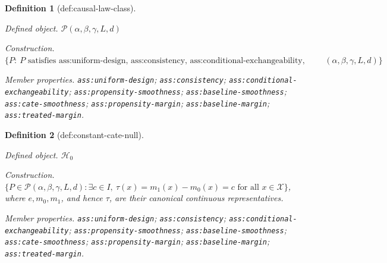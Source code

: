 \documentclass{article}
\newtheorem{definition}{Definition}
\begin{document}
\begin{definition}[def:causal-law-class]\label{def:causal-law-class}
\par\smallskip\noindent\emph{Defined object.} \(\mathcal P(\alpha,\beta,\gamma,L,d)\)
\par\smallskip\noindent\emph{Construction.} \(\{P:\ P\text{ satisfies ass:uniform-design, ass:consistency, ass:conditional-exchangeability, ass:propensity-smoothness, ass:baseline-smoothness, ass:cate-smoothness, ass:propensity-margin, ass:baseline-margin, and ass:treated-margin for the fixed }(\alpha,\beta,\gamma,L,d)\}\)
\par\smallskip\noindent\emph{Member properties.} \texttt{ass:\allowbreak{}uniform-\allowbreak{}design}; \texttt{ass:\allowbreak{}consistency}; \texttt{ass:\allowbreak{}conditional-\allowbreak{}exchangeability}; \texttt{ass:\allowbreak{}propensity-\allowbreak{}smoothness}; \texttt{ass:\allowbreak{}baseline-\allowbreak{}smoothness}; \texttt{ass:\allowbreak{}cate-\allowbreak{}smoothness}; \texttt{ass:\allowbreak{}propensity-\allowbreak{}margin}; \texttt{ass:\allowbreak{}baseline-\allowbreak{}margin}; \texttt{ass:\allowbreak{}treated-\allowbreak{}margin}.
\end{definition}

\begin{definition}[def:constant-cate-null]\label{def:constant-cate-null}
\par\smallskip\noindent\emph{Defined object.} \(\mathcal H_0\)
\par\smallskip\noindent\emph{Construction.} \(\{P\in\mathcal P(\alpha,\beta,\gamma,L,d):\exists c\in I,\ \tau(x)=m_1(x)-m_0(x)=c\text{ for all }x\in\mathcal X\}\), where \(e,m_0,m_1\), and hence \(\tau\), are their canonical continuous representatives.
\par\smallskip\noindent\emph{Member properties.} \texttt{ass:\allowbreak{}uniform-\allowbreak{}design}; \texttt{ass:\allowbreak{}consistency}; \texttt{ass:\allowbreak{}conditional-\allowbreak{}exchangeability}; \texttt{ass:\allowbreak{}propensity-\allowbreak{}smoothness}; \texttt{ass:\allowbreak{}baseline-\allowbreak{}smoothness}; \texttt{ass:\allowbreak{}cate-\allowbreak{}smoothness}; \texttt{ass:\allowbreak{}propensity-\allowbreak{}margin}; \texttt{ass:\allowbreak{}baseline-\allowbreak{}margin}; \texttt{ass:\allowbreak{}treated-\allowbreak{}margin}.
\end{definition}
\end{document}
